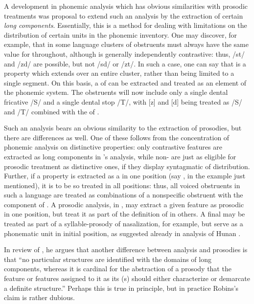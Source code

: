 A development in phonemic analysis which has obvious similarities with
pro\-sodic treatments was
 proposal to extend
such an analysis by the extraction of certain \emph{long
  components}. Essentially, this is a method for dealing with
limitations on the distribution of certain units in the phonemic
inventory. One may discover, for example, that in some language
clusters of obstruents must always have the same value for 
throughout, although  is generally independently contrastive:
thus, /st/ and /zd/ are possible, but not /sd/ or /zt/. In such a
case, one can say that  is a property which extends over an
entire cluster, rather than being limited to a single segment. On this
basis, a  of  can be extracted and treated as an
element of the phonemic system. The obstruents will now include only a
single dental fricative /S/ and a single dental stop /T/, with [z] and
[d] being treated as /S/ and /T/ combined with the 
 of .

Such an analysis bears an obvious similarity to the extraction of
prosodies, but there are differences as well. One of these follows
from the concentration of phonemic analysis on distinctive properties:
only contrastive features are extracted as long components in {\Harris}'s
analysis, while non- are just as eligible for
prosodic treatment as distinctive ones, if they display syntagmatic
 of distribution. Further, if a property is extracted as a
 in one position (say , in the example just
mentioned), it is to be so treated in all positions: thus, all voiced
obstruents in such a language are treated as combinations of a
nonspecific obstruent with the component of . A prosodic
analysis, in , may extract a given feature as prosodic in one
position, but treat it as part of the definition of 
in others. A final  may be treated as part of a
syllable-prosody of nasalization, for example, but serve as a
phonematic unit in initial position, as suggested already in
 analysis of Hunan .

In  review of
\citet{langendoen68:london.school}, he argues that another
difference between  analysis and prosodies is that ``no
particular structures are identified with the domains of long
components, whereas it is cardinal for the abstraction of a prosody
that the feature or features assigned to it as its (s) should
either characterize or demarcate a definite structure.'' Perhaps this
is true in principle, but in practice Robins's claim is rather
dubious.

